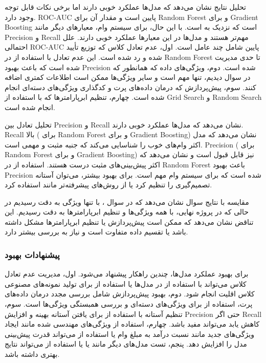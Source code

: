 \documentclass{article}
\begin{document}
تحلیل نتایج نشان می‌دهد که مدل‌ها عملکرد خوبی دارند اما برخی نکات قابل توجه وجود دارد. ROC-AUC پایین است و مقدار آن  برای Random Forest و  برای Gradient Boosting است که نزدیک به  است. با این حال، برای سیستم وام، معیارهای دیگر مانند Precision و Recall مهم‌تر هستند و مدل‌ها در این معیارها عملکرد خوبی دارند. علل احتمالی ROC-AUC پایین شامل چند عامل است. اول، عدم تعادل کلاس که توزیع  تأیید شده و  رد شده است. این عدم تعادل با استفاده از  در Random Forest تا حدی مدیریت شده است که باعث بهبود Precision شده است. دوم، ویژگی‌های داده که همانطور که در سوال  دیدیم، تنها  مهم است و سایر ویژگی‌ها ممکن است اطلاعات کمتری اضافه کنند. سوم، پیش‌پردازش که درمان داده‌های پرت و کدگذاری ویژگی‌های دسته‌ای انجام شده است. چهارم، تنظیم ابرپارامترها که با استفاده از Grid Search و Random Search انجام شده است.

تحلیل تعادل بین Precision و Recall نشان می‌دهد که مدل‌ها عملکرد خوبی دارند. Recall بالا ( برای Random Forest و  برای Gradient Boosting) نشان می‌دهد که مدل اکثر وام‌های خوب را شناسایی می‌کند که جنبه مثبت و مهمی است. Precision ( برای Random Forest و  برای Gradient Boosting) نیز قابل قبول است و نشان می‌دهد که اکثر پیش‌بینی‌های مثبت درست هستند. استفاده از  در Random Forest باعث بهبود Precision شده است که برای سیستم وام مهم است. برای بهبود بیشتر، می‌توان آستانه تصمیم‌گیری را تنظیم کرد یا از روش‌های پیشرفته‌تر مانند  استفاده کرد.

مقایسه با نتایج سوال  نشان می‌دهد که در سوال ، با تنها ویژگی  به دقت  رسیدیم در حالی که در پروژه نهایی، با همه ویژگی‌ها و تنظیم ابرپارامترها به دقت  رسیدیم. این تناقض نشان می‌دهد که ممکن است پیش‌پردازش یا تنظیم ابرپارامترها مشکل داشته باشد یا تقسیم داده متفاوت است و نیاز به بررسی بیشتر دارد.

\subsubsection{پیشنهادات بهبود}

برای بهبود عملکرد مدل‌ها، چندین راهکار پیشنهاد می‌شود. اول، مدیریت عدم تعادل کلاس می‌تواند با استفاده از  در مدل‌ها یا استفاده از  برای تولید نمونه‌های مصنوعی کلاس اقلیت انجام شود. دوم، بهبود پیش‌پردازش شامل بررسی مجدد درمان داده‌های پرت، استفاده از  برای ویژگی‌های دسته‌ای و بررسی همبستگی ویژگی‌ها است. سوم، تنظیم آستانه با استفاده از  برای یافتن آستانه بهینه و افزایش Precision حتی اگر Recall کاهش یابد می‌تواند مفید باشد. چهارم، استفاده از ویژگی‌های مهندسی شده مانند ایجاد ویژگی‌های جدید مانند نسبت درآمد به مبلغ وام یا استفاده از  می‌تواند قدرت پیش‌بینی مدل را افزایش دهد. پنجم، تست مدل‌های دیگر مانند  یا  یا استفاده از  می‌تواند نتایج بهتری داشته باشد.
\end{document}

